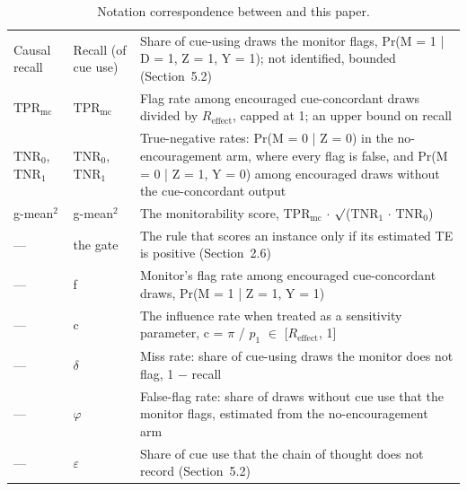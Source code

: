 \documentclass[11pt]{article}
\begin{document}
\begin{table}[H]
\begin{tabularx}{\linewidth}{@{}>{\raggedright\arraybackslash}p{2.4cm}>{\raggedright\arraybackslash}p{2.2cm}X@{}}
    Causal recall & Recall (of cue use) & Share of cue-using draws the monitor flags, Pr(M = 1 | D = 1, Z = 1, Y = 1); not identified, bounded (Section~5.2) \\ \addlinespace[3pt]
    $\mathrm{TPR}_{\mathrm{mc}}$ & $\mathrm{TPR}_{\mathrm{mc}}$ & Flag rate among encouraged cue-concordant draws divided by $R_{\mathrm{effect}}$, capped at 1; an upper bound on recall \\ \addlinespace[3pt]
    $\mathrm{TNR}_0$, $\mathrm{TNR}_1$ & $\mathrm{TNR}_0$, $\mathrm{TNR}_1$ & True-negative rates: Pr(M = 0 | Z = 0) in the no-encouragement arm, where every flag is false, and Pr(M = 0 | Z = 1, Y = 0) among encouraged draws without the cue-concordant output \\ \addlinespace[3pt]
    g-mean$^2$ & g-mean$^2$ & The monitorability score, $\mathrm{TPR}_{\mathrm{mc}}$ $\cdot$ $\surd$($\mathrm{TNR}_1$ $\cdot$ $\mathrm{TNR}_0$) \\ \addlinespace[3pt]
    — & the gate & The rule that scores an instance only if its estimated TE is positive (Section~2.6) \\ \addlinespace[3pt]
    — & f & Monitor’s flag rate among encouraged cue-concordant draws, Pr(M = 1 | Z = 1, Y = 1) \\ \addlinespace[3pt]
    — & c & The influence rate when treated as a sensitivity parameter, c = $\pi$ / $p_1$ $\in$ [$R_{\mathrm{effect}}$, 1] \\ \addlinespace[3pt]
    — & $\delta$ & Miss rate: share of cue-using draws the monitor does not flag, 1 $-$ recall \\ \addlinespace[3pt]
    — & $\varphi$ & False-flag rate: share of draws without cue use that the monitor flags, estimated from the no-encouragement arm \\ \addlinespace[3pt]
    — & $\varepsilon$ & Share of cue use that the chain of thought does not record (Section~5.2) \\
    \bottomrule
  \end{tabularx}
  \caption{Notation correspondence between \citet{guan2025monitoring} and this paper.}
\end{table}
\end{document}
